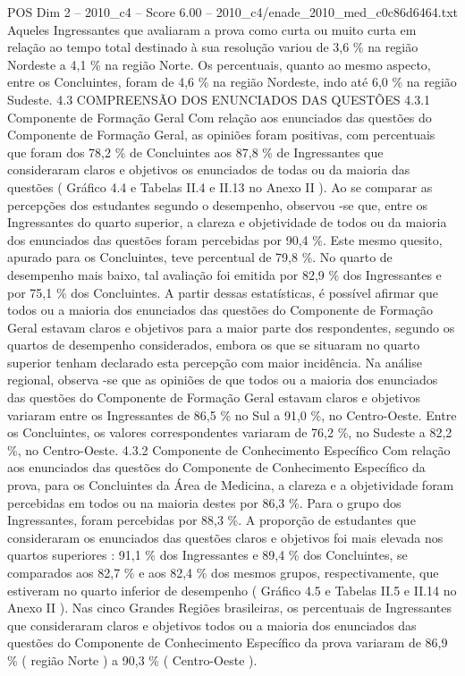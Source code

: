 \begin{textsample}{POS Dim 2 – 2010\_c4 – Score 6.00 – 2010\_c4/enade\_2010\_med\_c0c86d6464.txt}
Aqueles Ingressantes que avaliaram a prova como curta ou muito curta em relação ao tempo total destinado à sua resolução variou de 3,6 \% na região Nordeste a 4,1 \% na região Norte.
Os percentuais, quanto ao mesmo aspecto, entre os Concluintes, foram de 4,6 \% na região Nordeste, indo até 6,0 \% na região Sudeste. 4.3 COMPREENSÃO DOS ENUNCIADOS DAS QUESTÕES 4.3.1 Componente de Formação Geral Com relação aos enunciados das questões do Componente de Formação Geral, as opiniões foram positivas, com percentuais que foram dos 78,2 \% de Concluintes aos 87,8 \% de Ingressantes que consideraram claros e objetivos os enunciados de todas ou da maioria das questões ( Gráfico 4.4 e Tabelas II.4 e II.13 no Anexo II ).
Ao se comparar as percepções dos estudantes segundo o desempenho, observou -se que, entre os Ingressantes do quarto superior, a clareza e objetividade de todos ou da maioria dos enunciados das questões foram percebidas por 90,4 \%.
Este mesmo quesito, apurado para os Concluintes, teve percentual de 79,8 \%.
No quarto de desempenho mais baixo, tal avaliação foi emitida por 82,9 \% dos Ingressantes e por 75,1 \% dos Concluintes.
A partir dessas estatísticas, é possível afirmar que todos ou a maioria dos enunciados das questões do Componente de Formação Geral estavam claros e objetivos para a maior parte dos respondentes, segundo os quartos de desempenho considerados, embora os que se situaram no quarto superior tenham declarado esta percepção com maior incidência.
Na análise regional, observa -se que as opiniões de que todos ou a maioria dos enunciados das questões do Componente de Formação Geral estavam claros e objetivos variaram entre os Ingressantes de 86,5 \% no Sul a 91,0 \%, no Centro-Oeste.
Entre os Concluintes, os valores correspondentes variaram de 76,2 \%, no Sudeste a 82,2 \%, no Centro-Oeste. 4.3.2 Componente de Conhecimento Específico Com relação aos enunciados das questões do Componente de Conhecimento Específico da prova, para os Concluintes da Área de Medicina, a clareza e a objetividade foram percebidas em todos ou na maioria destes por 86,3 \%.
Para o grupo dos Ingressantes, foram percebidas por 88,3 \%.
A proporção de estudantes que consideraram os enunciados das questões claros e objetivos foi mais elevada nos quartos superiores : 91,1 \% dos Ingressantes e 89,4 \% dos Concluintes, se comparados aos 82,7 \% e aos 82,4 \% dos mesmos grupos, respectivamente, que estiveram no quarto inferior de desempenho ( Gráfico 4.5 e Tabelas II.5 e II.14 no Anexo II ).
Nas cinco Grandes Regiões brasileiras, os percentuais de Ingressantes que consideraram claros e objetivos todos ou a maioria dos enunciados das questões do Componente de Conhecimento Específico da prova variaram de 86,9 \% ( região Norte ) a 90,3 \% ( Centro-Oeste ).

\end{textsample}
